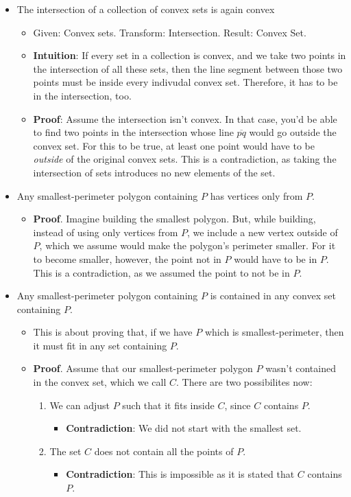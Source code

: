 \begin{itemize}
	\item The intersection of a collection of convex sets is again convex
	      \begin{itemize}
		      \item Given: Convex sets. Transform: Intersection. Result: Convex Set.
		      \item \textbf{Intuition}: If every set in a collection is convex, and we take two points in the intersection of all these sets, then the line segment between those two points must be inside every indivudal convex set. Therefore, it has to be in the intersection, too.
		      \item \textbf{Proof}: Assume the intersection isn't convex. In that case, you'd be able to find two points in the intersection whose line $\overline{pq}$ would go outside the convex set. For this to be true, at least one point would have to be \textit{outside} of the original convex sets. This is a contradiction, as taking the intersection of sets introduces no new elements of the set.
	      \end{itemize}
	\item Any smallest-perimeter polygon containing $P$ has vertices only from $P$.
	      \begin{itemize}
		      \item \textbf{Proof}. Imagine building the smallest polygon. But, while building, instead of using only vertices from $P$, we include a new vertex outside of $P$, which we assume would make the polygon's perimeter smaller. For it to become smaller, however, the point not in $P$ would have to be in $P$. This is a contradiction, as we assumed the point to not be in $P$.
	      \end{itemize}
	\item Any smallest-perimeter polygon containing $P$ is contained in any convex set containing $P$.
	      \begin{itemize}
		      \item This is about proving that, if we have $P$ which is smallest-perimeter, then it must fit in any set containing $P$.
		      \item \textbf{Proof}.
								Assume that our smallest-perimeter polygon $P$ wasn't contained in the convex set, which we call $C$. There are two possibilites now:
								\begin{enumerate}
									\item We can adjust $P$ such that it fits inside $C$, since $C$ contains $P$.
												\begin{itemize}
													\item \textbf{Contradiction}: We did not start with the smallest set.
												\end{itemize}
									\item The set $C$ does not contain all the points of $P$.
												\begin{itemize}
													\item \textbf{Contradiction}: This is impossible as it is stated that $C$ contains $P$.
												\end{itemize}
								\end{enumerate}


\end{itemize}
\end{itemize}
